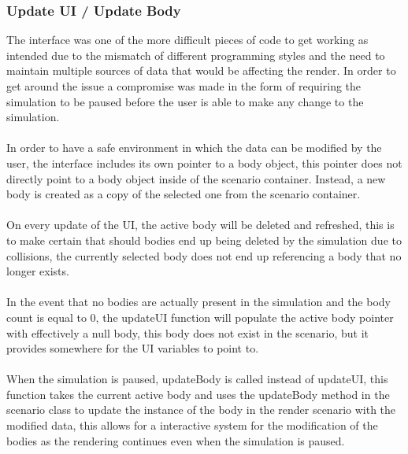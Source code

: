 \pagebreak

\subsubsection{Update UI / Update Body}
The interface was one of the more difficult pieces of code to get working as intended due to the mismatch of different programming styles and the need to maintain multiple sources of data that would be affecting the render. In order to get around the issue a compromise was made in the form of requiring the simulation to be paused before the user is able to make any change to the simulation.

\paragraph{}
In order to have a safe environment in which the data can be modified by the user, the interface includes its own pointer to a body object, this pointer does not directly point to a body object inside of the scenario container. Instead, a new body is created as a copy of the selected one from the scenario container.

\paragraph{}
On every update of the UI, the active body will be deleted and refreshed, this is to make certain that should bodies end up being deleted by the simulation due to collisions, the currently selected body does not end up referencing a body that no longer exists.

\paragraph{}
In the event that no bodies are actually present in the simulation and the body count is equal to 0, the updateUI function will populate the active body pointer with effectively a null body, this body does not exist in the scenario, but it provides somewhere for the UI variables to point to.

\paragraph{}
When the simulation is paused, updateBody is called instead of updateUI, this function takes the current active body and uses the updateBody method in the scenario class to update the instance of the body in the render scenario with the modified data, this allows for a interactive system for the modification of the bodies as the rendering continues even when the simulation is paused.

